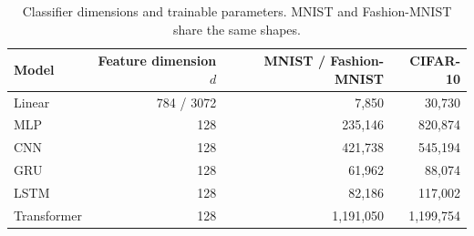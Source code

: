 \begin{table}[htbp]
\centering\small
\caption{Classifier dimensions and trainable parameters. MNIST and Fashion-MNIST share the same shapes.}
\label{tab:arch-comparison}
\begin{tabular}{lrrr}
\toprule
Model & Feature dimension $d$ & MNIST / Fashion-MNIST & CIFAR-10\\
\midrule
Linear & 784 / 3072 & 7,850 & 30,730\\
MLP & 128 & 235,146 & 820,874\\
CNN & 128 & 421,738 & 545,194\\
GRU & 128 & 61,962 & 88,074\\
LSTM & 128 & 82,186 & 117,002\\
Transformer & 128 & 1,191,050 & 1,199,754\\
\bottomrule
\end{tabular}
\end{table}
